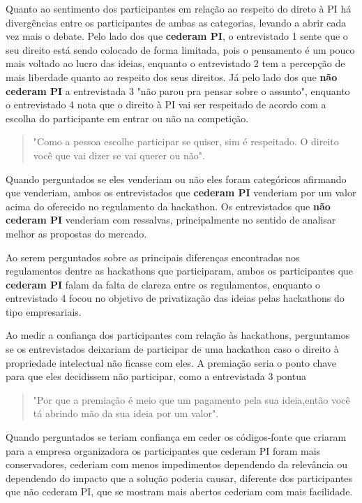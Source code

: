 Quanto ao sentimento dos participantes em relação ao respeito do direto à PI há divergências entre os participantes de ambas as categorias, levando a abrir cada vez mais o debate. Pelo lado dos que \textbf{cederam PI}, o entrevistado 1 sente que o seu direito está sendo colocado de forma limitada, pois o pensamento é um pouco mais voltado ao lucro das ideias, enquanto o entrevistado 2 tem a percepção de mais liberdade quanto ao respeito dos seus direitos. Já pelo lado dos que \textbf{não cederam PI} a entrevistada 3 "não parou pra pensar sobre o assunto", enquanto o entrevistado 4 nota que o direito à PI vai ser respeitado de acordo com a escolha do participante em entrar ou não na competição. \begin{quote}
    "Como a pessoa escolhe participar se quiser, sim é respeitado.  O direito você que vai dizer se vai querer ou não".
\end{quote}

Quando perguntados se eles venderiam ou não eles foram categóricos afirmando que venderiam, ambos os entrevistados que \textbf{cederam PI} venderiam por um valor acima do oferecido no regulamento da hackathon. Os entrevistados que \textbf{não cederam PI} venderiam com ressalvas, principalmente no sentido de analisar melhor as propostas do mercado.

Ao serem perguntados sobre as principais diferenças encontradas nos regulamentos dentre as hackathons que participaram, ambos os participantes que \textbf{cederam PI} falam da falta de clareza entre os regulamentos, enquanto o entrevistado 4 focou no objetivo de privatização das ideias pelas hackathons do tipo empresariais.

Ao medir a confiança dos participantes com relação às hackathons, perguntamos se os entrevistados deixariam de participar de uma hackathon caso o direito à propriedade intelectual não ficasse com eles. A premiação seria o ponto chave para que eles decidissem não participar, como a entrevistada 3 pontua \begin{quote}
    "Por que a premiação é meio que um pagamento pela sua ideia,então você tá abrindo mão da sua ideia por um valor".
\end{quote}

Quando perguntados se teriam confiança em ceder os códigos-fonte que criaram para a empresa organizadora os participantes que cederam PI foram mais conservadores, cederiam com menos impedimentos dependendo da relevância ou dependendo do impacto que a solução poderia causar, diferente dos participantes que não cederam PI, que se mostram mais abertos cederiam com mais facilidade.

